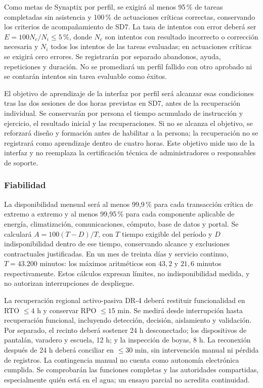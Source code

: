 Como metas de Synaptix por perfil, se exigirá al menos 95\,\% de tareas completadas sin asistencia y 100\,\% de actuaciones críticas correctas, conservando los criterios de acompañamiento de SD7. La tasa de intentos con error deberá ser $E=100N_e/N_i\leq5\,\%$, donde $N_e$ son intentos con resultado incorrecto o corrección necesaria y $N_i$ todos los intentos de las tareas evaluadas; en actuaciones críticas se exigirá cero errores. Se registrarán por separado abandonos, ayuda, repeticiones y duración. No se promediará un perfil fallido con otro aprobado ni se contarán intentos sin tarea evaluable como éxitos.

El objetivo de aprendizaje de la interfaz por perfil será alcanzar esas condiciones tras las dos sesiones de dos horas previstas en SD7, antes de la recuperación individual. Se conservarán por persona el tiempo acumulado de instrucción y ejercicio, el resultado inicial y las recuperaciones. Si no se alcanza el objetivo, se reforzará diseño y formación antes de habilitar a la persona; la recuperación no se registrará como aprendizaje dentro de cuatro horas. Este objetivo mide uso de la interfaz y no reemplaza la certificación técnica de administradores o responsables de soporte. \parencite[sec.~7.2, Capacitación, evaluación y preparación por sitio; Adopción y acompañamiento decreciente]{sd9-sd7}

\subsubsection{Fiabilidad}
La disponibilidad mensual será al menos 99,9\,\% para cada transacción crítica de extremo a extremo y al menos 99,95\,\% para cada componente aplicable de energía, climatización, comunicaciones, cómputo, base de datos y portal. Se calculará $A=100(T-D)/T$, con $T$ tiempo exigible del período y $D$ indisponibilidad dentro de ese tiempo, conservando alcance y exclusiones contractuales justificadas. En un mes de treinta días y servicio continuo, $T=43.200$ minutos: los máximos aritméticos son $43,2$ y $21,6$ minutos respectivamente. Estos cálculos expresan límites, no indisponibilidad medida, y no autorizan interrupciones de despliegue. \parencite[cap.~7, pp.~17--18; RT-10.01/06, p.~22]{sd9-bt}

La recuperación regional activo-pasiva DR-4 deberá restituir funcionalidad en RTO $\leq4$ h y conservar RPO $\leq15$ min. Se medirá desde interrupción hasta recuperación funcional, incluyendo detección, decisión, aislamiento y validación. Por separado, el recinto deberá sostener 24 h desconectado; los dispositivos de pantalán, varadero y escuela, 12 h; y la inspección de boyas, 8 h. La reconexión después de 24 h deberá conciliar en $\leq30$ min, sin intervención manual ni pérdida de registros. La contingencia manual no cuenta como autonomía electrónica cumplida. Se comprobarán las funciones completas y las autoridades compartidas, especialmente quién está en el agua; un ensayo parcial no acredita continuidad. \parencites[cap.~15, RT-03.10/13, p.~34]{sd9-c07}[sec.~4.3.2, DR-4]{sd9-sd4}

